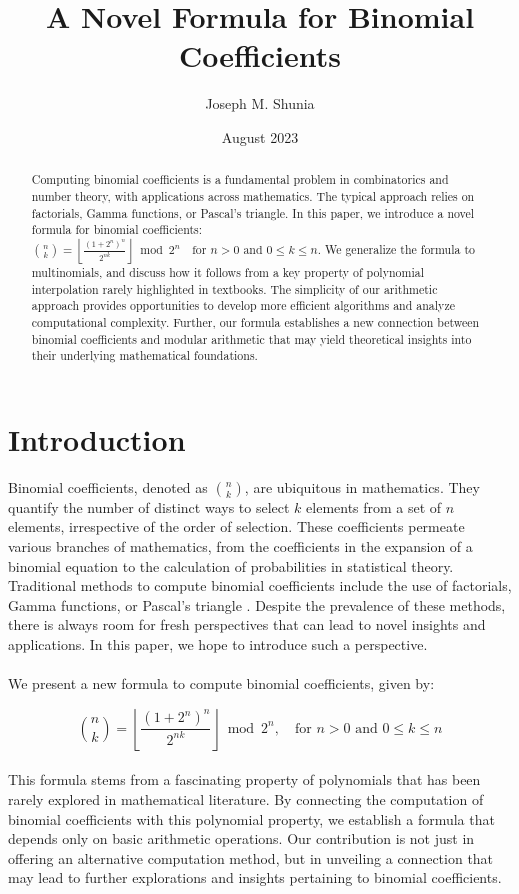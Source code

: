 \documentclass{article}
\title{A Novel Formula for Binomial Coefficients}
\author{Joseph M. Shunia}
\date{August 2023}
\theoremstyle{plain}
\begin{document}
\maketitle

\begin{abstract}
Computing binomial coefficients is a fundamental problem in combinatorics and number theory, with applications across mathematics. The typical approach relies on factorials, Gamma functions, or Pascal's triangle. In this paper, we introduce a novel formula for binomial coefficients: \(\binom{n}{k} = \left\lfloor\frac{(1 + 2^{n})^{n}}{2^{n k}}\right\rfloor \bmod{2^{n}} \quad \text{for } n > 0 \text{ and } 0 \leq k \leq n\). We generalize the formula to multinomials, and discuss how it follows from a key property of polynomial interpolation rarely highlighted in textbooks. The simplicity of our arithmetic approach provides opportunities to develop more efficient algorithms and analyze computational complexity. Further, our formula establishes a new connection between binomial coefficients and modular arithmetic that may yield theoretical insights into their underlying mathematical foundations.
\end{abstract}

\section{Introduction}
Binomial coefficients, denoted as \(\binom{n}{k}\), are ubiquitous in mathematics. They quantify the number of distinct ways to select \(k\) elements from a set of \(n\) elements, irrespective of the order of selection. These coefficients permeate various branches of mathematics, from the coefficients in the expansion of a binomial equation to the calculation of probabilities in statistical theory. Traditional methods to compute binomial coefficients include the use of factorials, Gamma functions, or Pascal's triangle \cite{brualdi1992introductory}. Despite the prevalence of these methods, there is always room for fresh perspectives that can lead to novel insights and applications. In this paper, we hope to introduce such a perspective.
\\
\\
We present a new formula to compute binomial coefficients, given by:

\begin{equation}
\binom{n}{k} = \left\lfloor\frac{(1 + 2^{n})^{n}}{2^{n k}}\right\rfloor \bmod{2^{n}}, \quad \text{for } n > 0 \text{ and } 0 \leq k \leq n
\end{equation}
\\
This formula stems from a fascinating property of polynomials that has been rarely explored in mathematical literature. By connecting the computation of binomial coefficients with this polynomial property, we establish a formula that depends only on basic arithmetic operations. Our contribution is not just in offering an alternative computation method, but in unveiling a connection that may lead to further explorations and insights pertaining to binomial coefficients.
\end{document}
